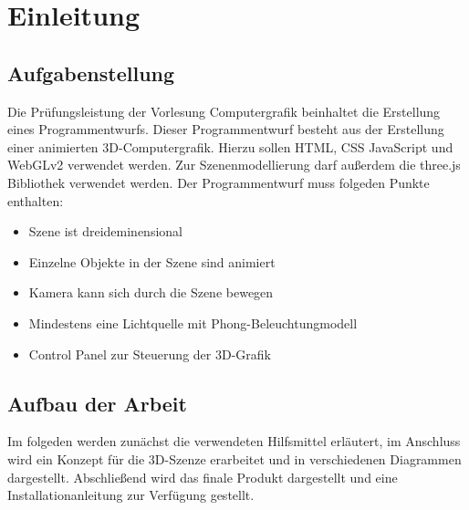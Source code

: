 \section{Einleitung}
\subsection{Aufgabenstellung}
Die Prüfungsleistung der Vorlesung Computergrafik beinhaltet die Erstellung eines Programmentwurfs.
\newline
Dieser Programmentwurf besteht aus der Erstellung einer animierten 3D-Computergrafik.
Hierzu sollen HTML, CSS JavaScript und WebGLv2 verwendet werden. Zur Szenenmodellierung darf außerdem die three.js Bibliothek verwendet werden.
Der Programmentwurf muss folgeden Punkte enthalten:
\begin{itemize}
\item Szene ist dreideminensional
\item Einzelne Objekte in der Szene sind animiert
\item Kamera kann sich durch die Szene bewegen
\item Mindestens eine Lichtquelle mit Phong-Beleuchtungmodell
\item Control Panel zur Steuerung der 3D-Grafik
\end{itemize}

\subsection{Aufbau der Arbeit}
Im folgeden werden zunächst die verwendeten Hilfsmittel erläutert,
im Anschluss wird ein Konzept für die 3D-Szenze erarbeitet und in verschiedenen Diagrammen dargestellt.
Abschließend wird das finale Produkt dargestellt und eine Installationanleitung zur Verfügung gestellt.
